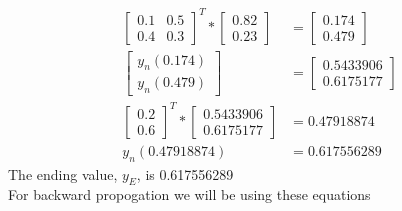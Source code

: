 \documentclass[12pt,english]{article}
\begin{document}
\begin{align}
\begin{bmatrix} 0.1 & 0.5 \\ 0.4 & 0.3 \end{bmatrix}^T * \begin{bmatrix} 0.82 \\ 0.23 \end{bmatrix}  &= \begin{bmatrix} 0.174 \\ 0.479 \end{bmatrix} \\
\begin{bmatrix} y_n(0.174) \\ y_n(0.479) \end{bmatrix} &= \begin{bmatrix} 0.5433906 \\ 0.6175177 \end{bmatrix} \\
\begin{bmatrix} 0.2 \\ 0.6 \end{bmatrix}^T * \begin{bmatrix} 0.5433906 \\ 0.6175177 \end{bmatrix} &=0.47918874\\
y_n(0.47918874) &= 0.617556289
\end{align}
The ending value, $y_E$, is 0.617556289\\
For backward propogation we  will be using these equations
\end{document}
